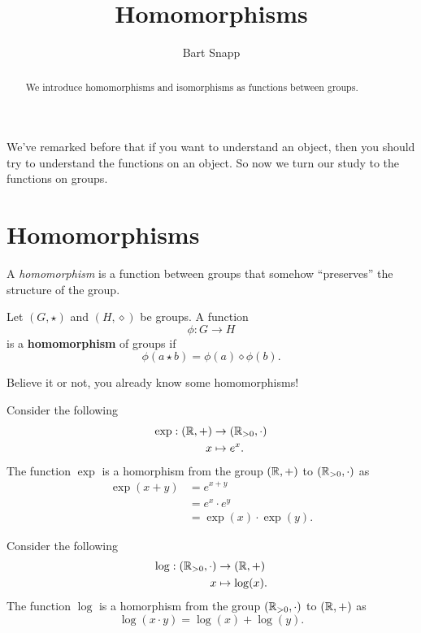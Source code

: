 \documentclass{ximera}
\author{Bart Snapp}
\title{Homomorphisms}
\begin{document}
\begin{abstract}
  We introduce homomorphisms and isomorphisms as functions between
  groups.
\end{abstract}
\maketitle

We've remarked before that if you want to understand an object, then
you should try to understand the functions on an object. So now we
turn our study to the functions on groups.


\section{Homomorphisms}


A \textit{homomorphism} is a function between groups that somehow
``preserves'' the structure of the group.


\begin{definition}
  Let $(G,\star)$ and $(H,\diamond)$ be groups. A function
  \[
  \phi:G\to H
  \]
  is a \textbf{homomorphism} of groups if
  \[
  \phi(a\star b) = \phi(a)\diamond\phi(b).
  \]
\end{definition}

Believe it or not, you already know some homomorphisms!

\begin{example}\label{EG:exp}
  Consider the following
  \begin{align*}
    \exp:(\mathbb R,+) &\to (\mathbb R_{> 0},\cdot) \\
    x &\mapsto e^x.
  \end{align*}
  The function $\exp$ is a homorphism from the group $(\mathbb R,+)$ to
  $(\mathbb R_{> 0},\cdot)$ as
  \begin{align*}
    \exp(x+y) &= e^{x+y} \\
    &= e^x \cdot e^y\\
    &= \exp(x)\cdot \exp(y).
  \end{align*}
\end{example}



\begin{example}\label{EG:log}
  Consider the following
  \begin{align*}
    \log:(\mathbb R_{> 0},\cdot) &\to (\mathbb R,+)\\
    x &\mapsto \log(x).
  \end{align*}
  The function $\log$ is a homorphism from the group $(\mathbb R_{> 0},\cdot)$ to $(\mathbb R,+)$ as
  \[
  \log(x\cdot y) = \log(x) + \log(y).
  \]
\end{example}
\end{document}
